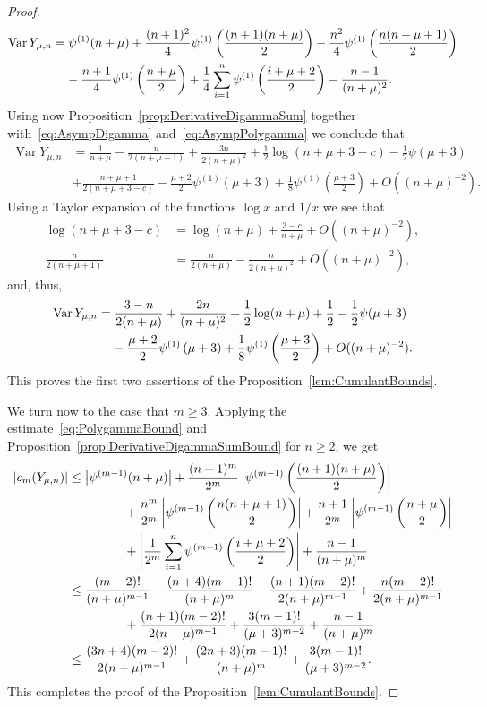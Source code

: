 \documentclass[AHL,Unicode,longabstracts,published]{cedram}
\newcommand{\Var}{\mathop{\mathrm{Var}}\nolimits}
\begin{document}
\begin{proof}
\begin{align*}
\Var Y_{\mu,n}&=\psi^{(1)}(n+\mu)+\frac{(n+1)^2}{4}\psi^{(1)}\left(\frac{(n+1)(n+\mu)}{2}\right)-\frac{n^2}{4}\psi^{(1)}\left(\frac{n(n+\mu+1)}{2}\right)\\
&\mkern20mu -\frac{n+1}{4}\psi^{(1)}\left(\frac{n+\mu}{2}\right)+\frac{1}{4}\sum\limits_{i=1}^n\psi^{(1)}\left(\frac{i+\mu+2}{2}\right)-\frac{n-1}{(n+\mu)^2}.
\end{align*}
Using now Proposition~\ref{prop:DerivativeDigammaSum} together with~\eqref{eq:AsympDigamma} and~\eqref{eq:AsympPolygamma} we conclude that
\begin{align*}
\Var Y_{\mu,n}&=\frac{1}{n+\mu}-\frac{n}{2(n+\mu+1)}+\frac{3n}{2(n+\mu)^2}+\frac12\log(n+\mu+3-c)-\frac12\psi(\mu+3)\\
&+\frac{n+\mu+1}{2(n+\mu+3-c)}-\frac{\mu+2}{2}\psi^{(1)}(\mu+3)+\frac{1}{8}\psi^{(1)}\left(\frac{\mu+3}{2}\right)+O\left((n+\mu)^{-2}\right).
\end{align*}
Using a Taylor expansion of the functions $\log x$ and $1/x$ we see that
\begin{align*}
\log(n+\mu+3-c)&=\log (n+\mu)+\frac{3-c}{n+\mu}+O\left((n+\mu)^{-2}\right),\\
\frac{n}{2(n+\mu+1)}&=\frac{n}{2(n+\mu)}-\frac{n}{2(n+\mu)^2}+O\left((n+\mu)^{-2}\right),
\end{align*}
and, thus,
\begin{align*}
\Var Y_{\mu,n}&=\frac{3-n}{2(n+\mu)}+\frac{2n}{(n+\mu)^2}+\frac12\log(n+\mu)+\frac{1}{2}-\frac12\psi(\mu+3)\\
&\mkern20mu -\frac{\mu+2}{2}\psi^{(1)}\left(\mu+3\right)+\frac{1}{8}\psi^{(1)}\left(\frac{\mu+3}{2}\right)+O((n+\mu)^{-2}).
\end{align*}
This proves the first two assertions of the Proposition~\ref{lem:CumulantBounds}.

We turn now to the case that $m\geq 3$. Applying the estimate~\eqref{eq:PolygammaBound} and Proposition~\ref{prop:DerivativeDigammaSumBound} for $n\ge 2$, we get
\begin{align*}
|c_m(Y_{\mu,n})|&\leq\big|\psi^{(m-1)}(n+\mu)\big|+\frac{(n+1)^m}{2^m}\left|\psi^{(m-1)}\left(\frac{(n+1)(n+\mu)}{2}\right)\right|\\
&\mkern80mu+\frac{n^m}{2^m}\left|\psi^{(m-1)}\left(\frac{n(n+\mu+1)}{2}\right)\right|+\frac{n+1}{2^m}\left|\psi^{(m-1)}\left(\frac{n+\mu}{2}\right)\right|\\
&\mkern80mu+\left|\frac{1}{2^m}\sum\limits_{i=1}^n\psi^{(m-1)}\left(\frac{i+\mu+2}{2}\right)\right|+\frac{n-1}{(n+\mu)^m}\\
&\leq\frac{(m-2)!}{(n+\mu)^{m-1}}+\frac{(n+4)(m-1)!}{(n+\mu)^{m}}+\frac{(n+1)(m-2)!}{2(n+\mu)^{m-1}}+\frac{n(m-2)!}{2(n+\mu)^{m-1}}\\
&\mkern80mu+\frac{(n+1)(m-2)!}{2(n+\mu)^{m-1}}+\frac{3(m-1)!}{(\mu+3)^{m-2}}+\frac{n-1}{(n+\mu)^m}\\
&\leq\frac{(3n+4)(m-2)!}{2(n+\mu)^{m-1}}+\frac{(2n+3)(m-1)!}{(n+\mu)^{m}}+\frac{3(m-1)!}{(\mu+3)^{m-2}}.
\end{align*}
This completes the proof of the Proposition~\ref{lem:CumulantBounds}.
\end{proof}
\end{document}

